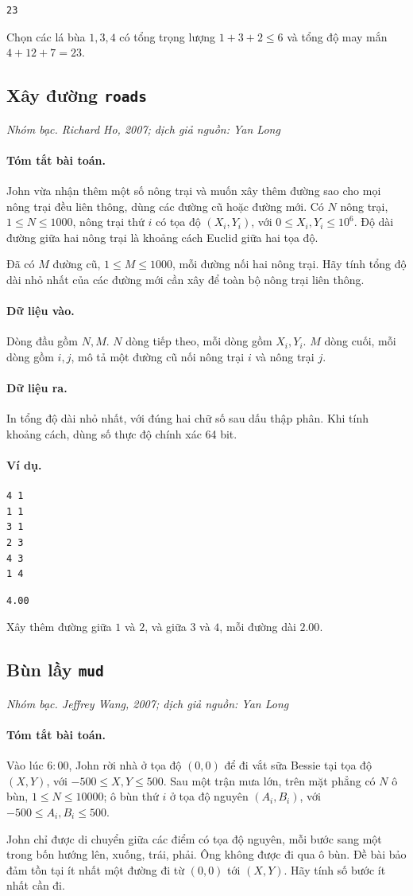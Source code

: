 \documentclass[11pt]{article}
\newcommand{\problem}[4]{%
  \subsection[#1 (#2)]{#1 \hfill {\normalsize\texttt{#2}}}%
  \noindent\textit{#3. #4}\par\smallskip
}
\newcommand{\iosec}[1]{\paragraph{#1}}
\begin{document}
\begin{verbatim}
23
\end{verbatim}

Chọn các lá bùa \(1,3,4\) có tổng trọng lượng \(1+3+2\le6\) và tổng độ may
mắn \(4+12+7=23\).

\problem{Xây đường}{roads}{Nhóm bạc}{Richard Ho, 2007; dịch giả nguồn: Yan Long}

\iosec{Tóm tắt bài toán.}
John vừa nhận thêm một số nông trại và muốn xây thêm đường sao cho mọi nông
trại đều liên thông, dùng các đường cũ hoặc đường mới. Có \(N\) nông trại,
\(1\le N\le 1000\), nông trại thứ \(i\) có tọa độ \((X_i,Y_i)\), với
\(0\le X_i,Y_i\le 10^6\). Độ dài đường giữa hai nông trại là khoảng cách
Euclid giữa hai tọa độ.

Đã có \(M\) đường cũ, \(1\le M\le 1000\), mỗi đường nối hai nông trại. Hãy
tính tổng độ dài nhỏ nhất của các đường mới cần xây để toàn bộ nông trại
liên thông.

\iosec{Dữ liệu vào.}
Dòng đầu gồm \(N,M\). \(N\) dòng tiếp theo, mỗi dòng gồm \(X_i,Y_i\). \(M\)
dòng cuối, mỗi dòng gồm \(i,j\), mô tả một đường cũ nối nông trại \(i\) và
nông trại \(j\).

\iosec{Dữ liệu ra.}
In tổng độ dài nhỏ nhất, với đúng hai chữ số sau dấu thập phân. Khi tính
khoảng cách, dùng số thực độ chính xác 64 bit.

\iosec{Ví dụ.}
\begin{verbatim}
4 1
1 1
3 1
2 3
4 3
1 4
\end{verbatim}

\begin{verbatim}
4.00
\end{verbatim}

Xây thêm đường giữa \(1\) và \(2\), và giữa \(3\) và \(4\), mỗi đường dài
\(2.00\).

\problem{Bùn lầy}{mud}{Nhóm bạc}{Jeffrey Wang, 2007; dịch giả nguồn: Yan Long}

\iosec{Tóm tắt bài toán.}
Vào lúc \(6{:}00\), John rời nhà ở tọa độ \((0,0)\) để đi vắt sữa Bessie tại
tọa độ \((X,Y)\), với \(-500\le X,Y\le 500\). Sau một trận mưa lớn, trên mặt
phẳng có \(N\) ô bùn, \(1\le N\le 10000\); ô bùn thứ \(i\) ở tọa độ nguyên
\((A_i,B_i)\), với \(-500\le A_i,B_i\le 500\).

John chỉ được di chuyển giữa các điểm có tọa độ nguyên, mỗi bước sang một
trong bốn hướng lên, xuống, trái, phải. Ông không được đi qua ô bùn. Đề bài
bảo đảm tồn tại ít nhất một đường đi từ \((0,0)\) tới \((X,Y)\). Hãy tính số
bước ít nhất cần đi.
\end{document}
